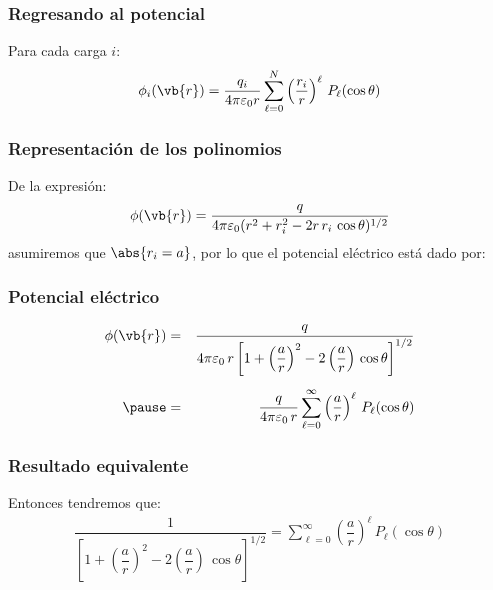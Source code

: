 \begin{frame}
\frametitle{Regresando al potencial}
Para cada carga $i$:
\begin{align*}
\phi_{i} (\vb{r}) = \dfrac{q_{i}}{4 \pi \varepsilon_{0} r} \sum_{\ell=0}^{N} \left( \dfrac{r_{i}}{r} \right)^{\ell} \, P_{\ell} (\cos \theta)
\end{align*}
\end{frame}
\begin{frame}
\frametitle{Representación de los polinomios}
De la expresión:
\begin{align*}
\phi(\vb{r}) = \dfrac{q}{4 \pi \varepsilon_{0} (r^{2} + r_{i}^{2} - 2 r \, r_{i} \, \cos \theta)^{1/2}}
\end{align*}
\pause
asumiremos que $\abs{r_{i} = a}$, por lo que el potencial eléctrico está dado por:
\end{frame}
\begin{frame}
\frametitle{Potencial eléctrico}
\begin{eqnarray*}
\phi(\vb{r}) &=& \dfrac{q}{4 \pi \varepsilon_{0} \, r \left[ 1 + \left( \dfrac{a}{r} \right)^{2} - 2 \left( \dfrac{a}{r} \right) \, \cos \theta \right]^{1/2}} \\[0.5em] \pause
&=& \dfrac{q}{4 \pi \varepsilon_{0} \, r} \sum_{\ell=0}^{\infty} \left( \dfrac{a}{r} \right)^{\ell} \, P_{\ell} (\cos \theta)
\end{eqnarray*}
\end{frame}
\begin{frame}
\frametitle{Resultado equivalente}
Entonces tendremos que:
\begin{align*}
\dfrac{1}{\left[ 1 + \left( \dfrac{a}{r} \right)^{2} - 2 \left( \dfrac{a}{r} \right) \, \cos \theta \right]^{1/2}} = \sum_{\ell=0}^{\infty} \left( \dfrac{a}{r} \right)^{\ell} \, P_{\ell} (\cos \theta)
\end{align*}
\end{frame}
